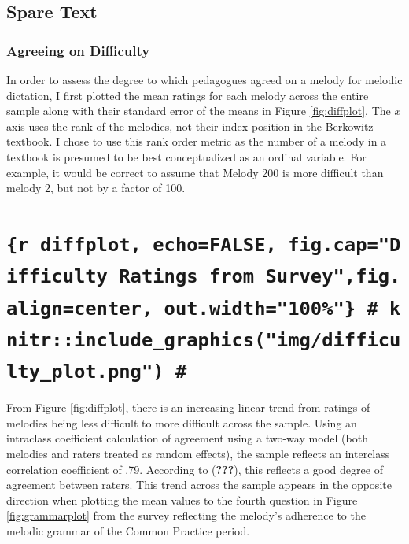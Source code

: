 \documentclass[english,man,floatsintext]{apa6}
\begin{document}
\hypertarget{spare-text}{%
\subsection{Spare Text}\label{spare-text}}

\hypertarget{agreeing-on-difficulty}{%
\subsubsection{Agreeing on Difficulty}\label{agreeing-on-difficulty}}

In order to assess the degree to which pedagogues agreed on a melody for melodic dictation, I first plotted the mean ratings for each melody across the entire sample along with their standard error of the means in Figure \ref{fig:diffplot}.
The \(x\) axis uses the rank of the melodies, not their index position in the Berkowitz textbook.
I chose to use this rank order metric as the number of a melody in a textbook is presumed to be best conceptualized as an ordinal variable.
For example, it would be correct to assume that Melody 200 is more difficult than melody 2, but not by a factor of 100.

\hypertarget{r-diffplot-echofalse-fig.capdifficulty-ratings-from-surveyfig.aligncenter-out.width100-knitrinclude_graphicsimgdifficulty_plot.png}{%
\section{\texorpdfstring{\texttt{\{r\ diffplot,\ echo=FALSE,\ fig.cap="Difficulty\ Ratings\ from\ Survey",fig.align=\textquotesingle{}center\textquotesingle{},\ out.width="100\%"\}\ \#\ knitr::include\_graphics("img/difficulty\_plot.png")\ \#}}{\{r diffplot, echo=FALSE, fig.cap="Difficulty Ratings from Survey",fig.align='center', out.width="100\%"\} \# knitr::include\_graphics("img/difficulty\_plot.png") \#}}\label{r-diffplot-echofalse-fig.capdifficulty-ratings-from-surveyfig.aligncenter-out.width100-knitrinclude_graphicsimgdifficulty_plot.png}}

From Figure \ref{fig:diffplot}, there is an increasing linear trend from ratings of melodies being less difficult to more difficult across the sample.
Using an intraclass coefficient calculation of agreement using a two-way model (both melodies and raters treated as random effects), the sample reflects an interclass correlation coefficient of .79.
According to ({\textbf{???}}), this reflects a good degree of agreement between raters.
This trend across the sample appears in the opposite direction when plotting the mean values to the fourth question in Figure \ref{fig:grammarplot} from the survey reflecting the melody's adherence to the melodic grammar of the Common Practice period.
\end{document}
